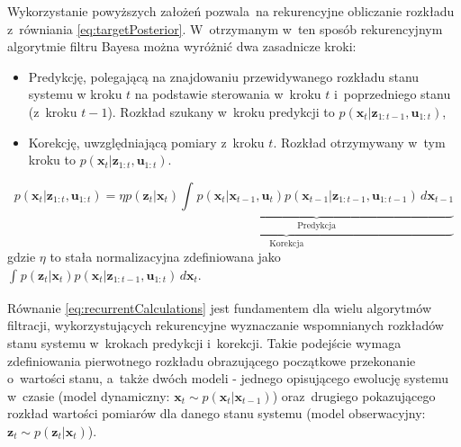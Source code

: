 Wykorzystanie powyższych założeń pozwala~na rekurencyjne obliczanie rozkładu z~równiania \ref{eq:targetPosterior}. W~otrzymanym w~ten sposób rekurencyjnym algorytmie filtru Bayesa można wyróżnić dwa zasadnicze kroki: 
\begin{itemize}
	\item Predykcję, polegającą na znajdowaniu przewidywanego rozkładu stanu systemu w kroku $t$ na podstawie sterowania w~kroku $t$ i~poprzedniego stanu (z~kroku $t-1$). Rozkład szukany w~kroku predykcji to $p(\boldsymbol{x}_t|\boldsymbol{z}_{1:t-1},\boldsymbol{u}_{1:t})$,
	\item Korekcję, uwzględniającą pomiary z~kroku $t$. Rozkład otrzymywany w~tym kroku to $p(\boldsymbol{x}_t|\boldsymbol{z}_{1:t},\boldsymbol{u}_{1:t})$.
\end{itemize}

\begin{equation} \label{eq:recurrentCalculations}
	p(\boldsymbol{x}_t|\boldsymbol{z}_{1:t},\boldsymbol{u}_{1:t})=\underbrace{\eta p(\boldsymbol{z}_t|\boldsymbol{x}_t)\underbrace{\int_{}^{}p(\boldsymbol{x}_t|\boldsymbol{x}_{t-1},\boldsymbol{u}_t)p(\boldsymbol{x}_{t-1}|\boldsymbol{z}_{1:t-1},\boldsymbol{u}_{1:t-1}) \,d\boldsymbol{x}_{t-1}}_{\textrm{Predykcja}}}_{\textrm{Korekcja}}
\end{equation}
gdzie $\eta$ to stała normalizacyjna zdefiniowana jako $\int_{}^{}p(\boldsymbol{z}_t|\boldsymbol{x}_{t})p(\boldsymbol{x}_t|\boldsymbol{z}_{1:t-1},\boldsymbol{u}_{1:t}) \,d\boldsymbol{x}_t$.
\par Równanie \ref{eq:recurrentCalculations} jest fundamentem dla wielu algorytmów filtracji, wykorzystujących rekurencyjne wyznaczanie wspomnianych rozkładów stanu systemu w~krokach predykcji i~korekcji. Takie podejście wymaga zdefiniowania pierwotnego rozkładu obrazującego początkowe przekonanie o~wartości stanu, a~także dwóch modeli -  jednego opisującego ewolucję systemu w~czasie (model dynamiczny: $\boldsymbol{x}_t\sim p(\boldsymbol{x}_t|\boldsymbol{x}_{t-1})$) oraz~drugiego pokazującego rozkład wartości pomiarów dla danego stanu systemu (model obserwacyjny: $\boldsymbol{z}_t\sim p(\boldsymbol{z}_t|\boldsymbol{x}_t)$). \cite[10]{Sarka} 
